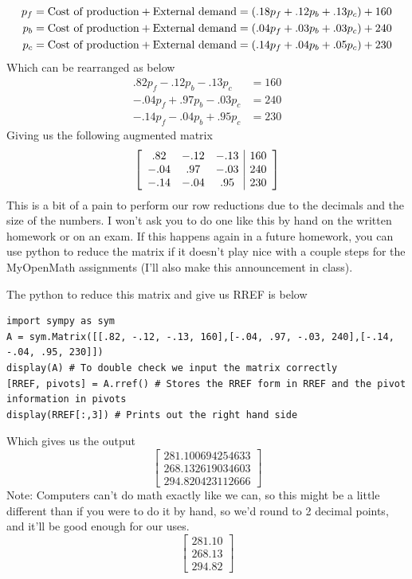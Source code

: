 \documentclass{article}
\begin{document}
    \begin{align*}
        p_f &= \textnormal{Cost of production} + \textnormal{External demand} = (.18p_f + .12p_b + .13p_c) + 160\\
        p_b &= \textnormal{Cost of production} + \textnormal{External demand} = (.04p_f + .03p_b + .03p_c) + 240\\
        p_c &= \textnormal{Cost of production} + \textnormal{External demand} = (.14p_f + .04p_b + .05p_c) + 230
    \end{align*}
    Which can be rearranged as below
    \begin{align*}
        .82p_f - .12p_b - .13p_c &= 160\\
       -.04p_f + .97p_b - .03p_c &= 240\\
       -.14p_f - .04p_b + .95p_c &= 230
    \end{align*}
    Giving us the following augmented matrix
    \[
        \aMat{ccc|c}{
                .82 & -.12 & -.13 & 160 \\
                -.04& .97  & -.03 & 240 \\
                -.14& -.04 & .95  & 230
        }
    \]
    This is a bit of a pain to perform our row reductions due to the decimals and the size of
    the numbers. I won't ask you to do one like this by hand on the written homework or on an exam.
    If this happens again in a future homework, you can use python to reduce the matrix if it doesn't
    play nice with a couple steps for the MyOpenMath assignments (I'll also make this announcement
    in class).
    
    The python to reduce this matrix and give us RREF is below
    \begin{verbatim}
import sympy as sym
A = sym.Matrix([[.82, -.12, -.13, 160],[-.04, .97, -.03, 240],[-.14, -.04, .95, 230]])
display(A) # To double check we input the matrix correctly
[RREF, pivots] = A.rref() # Stores the RREF form in RREF and the pivot information in pivots
display(RREF[:,3]) # Prints out the right hand side
    \end{verbatim}
    Which gives us the output
    \[
        \begin{bmatrix}
            281.100694254633\\268.132619034603\\294.820423112666
        \end{bmatrix}
    \]
    Note: Computers can't do math exactly like we can, so this might be a little different than
    if you were to do it by hand, so we'd round to 2 decimal points, and it'll be good enough for
    our uses.
    \[
        \begin{bmatrix}
            281.10\\268.13\\294.82
        \end{bmatrix}
    \]
\end{document}
